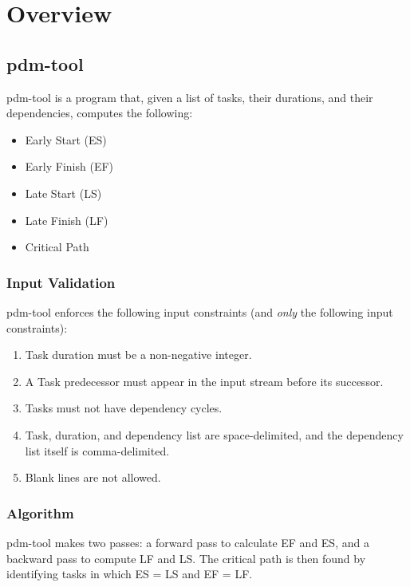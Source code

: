 \chapter{Overview}

\section{pdm-tool}

pdm-tool is a program that, given a list of tasks, their durations, and
their dependencies, computes the following:

\begin{itemize}
    \item Early Start (ES)
    \item Early Finish (EF)
    \item Late Start (LS)
    \item Late Finish (LF)
    \item Critical Path
\end{itemize}

\subsection{Input Validation}

pdm-tool enforces the following input constraints (and \textit{only} the
following input constraints):

\begin{enumerate}
    \item Task duration must be a non-negative integer.
    \item A Task predecessor must appear in the input stream before its
          successor.
    \item Tasks must not have dependency cycles.
    \item Task, duration, and dependency list are space-delimited, and the
          dependency list itself is comma-delimited.
    \item Blank lines are not allowed.
\end{enumerate}

\subsection{Algorithm}

pdm-tool makes two passes: a forward pass to calculate EF and ES, and a
backward pass to compute LF and LS. The critical path is then found by
identifying tasks in which ES = LS and EF = LF.
